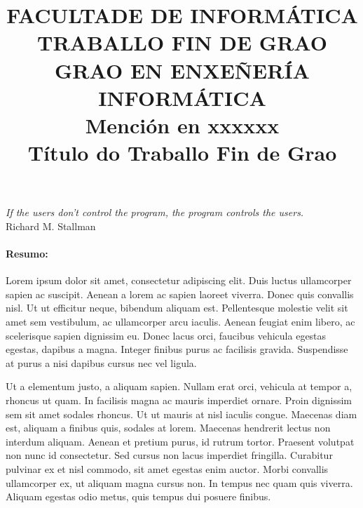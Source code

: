 \documentclass{pfc}
\date{}
\author{}
\title {
  \textmd{FACULTADE DE INFORMÁTICA}\\
  \vspace{2.2cm}
  \textmd{\Large TRABALLO FIN DE GRAO}\\
  \bigskip
  \textmd{\Large GRAO EN ENXEÑERÍA INFORMÁTICA}\\
  \bigskip
  \textmd{\large Mención en xxxxxx}\\
  \vspace{5.0cm} \textmd{\LARGE \textbf{Título do Traballo Fin de Grao}}\\
  \vspace{5.0cm} }
\begin{document}
\pdfstringdefDisableCommands{%
  \let\MakeUppercase\relax
}

\frontmatter

\maketitle

\begin{flushright}
  \vspace{3.0cm} \textit{If the users don't control the program, the
    program controls the users.}\\Richard M. Stallman
\end{flushright}

\blankpage





\paragraph{\large Resumo:}

Lorem ipsum dolor sit amet, consectetur adipiscing elit. Duis luctus
ullamcorper sapien ac suscipit. Aenean a lorem ac sapien laoreet
viverra. Donec quis convallis nisl. Ut ut efficitur neque, bibendum
aliquam est. Pellentesque molestie velit sit amet sem vestibulum, ac
ullamcorper arcu iaculis. Aenean feugiat enim libero, ac scelerisque
sapien dignissim eu. Donec lacus orci, faucibus vehicula egestas
egestas, dapibus a magna. Integer finibus purus ac facilisis
gravida. Suspendisse at purus a nisi dapibus cursus nec vel ligula.

Ut a elementum justo, a aliquam sapien. Nullam erat orci, vehicula at
tempor a, rhoncus ut quam. In facilisis magna ac mauris imperdiet
ornare. Proin dignissim sem sit amet sodales rhoncus. Ut ut mauris at
nisl iaculis congue. Maecenas diam est, aliquam a finibus quis,
sodales at lorem. Maecenas hendrerit lectus non interdum
aliquam. Aenean et pretium purus, id rutrum tortor. Praesent volutpat
non nunc id consectetur. Sed cursus non lacus imperdiet
fringilla. Curabitur pulvinar ex et nisl commodo, sit amet egestas
enim auctor. Morbi convallis ullamcorper ex, ut aliquam magna cursus
non. In tempus nec quam quis viverra. Aliquam egestas odio metus, quis
tempus dui posuere finibus.
\end{document}
